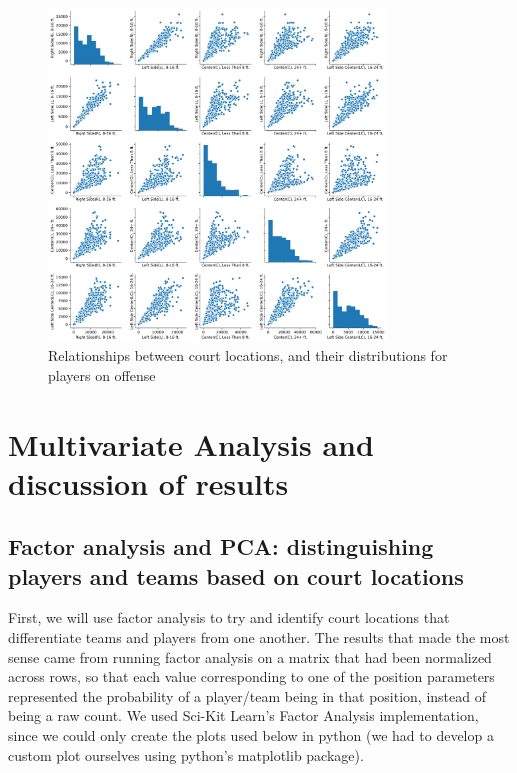 \documentclass[]{article}
\begin{document}
\begin{figure}
\centering
\includegraphics[width=0.80000\textwidth]{player_dist_and_relationships.png}
\caption{Relationships between court locations, and their distributions
for players on offense}
\end{figure}

\section{Multivariate Analysis and discussion of
results}\label{multivariate-analysis-and-discussion-of-results}

\subsection{Factor analysis and PCA: distinguishing players and teams
based on court
locations}\label{factor-analysis-and-pca-distinguishing-players-and-teams-based-on-court-locations}

First, we will use factor analysis to try and identify court locations
that differentiate teams and players from one another. The results that
made the most sense came from running factor analysis on a matrix that
had been normalized across rows, so that each value corresponding to one
of the position parameters represented the probability of a player/team
being in that position, instead of being a raw count. We used Sci-Kit
Learn's Factor Analysis implementation, since we could only create the
plots used below in python (we had to develop a custom plot ourselves
using python's matplotlib package).
\end{document}
